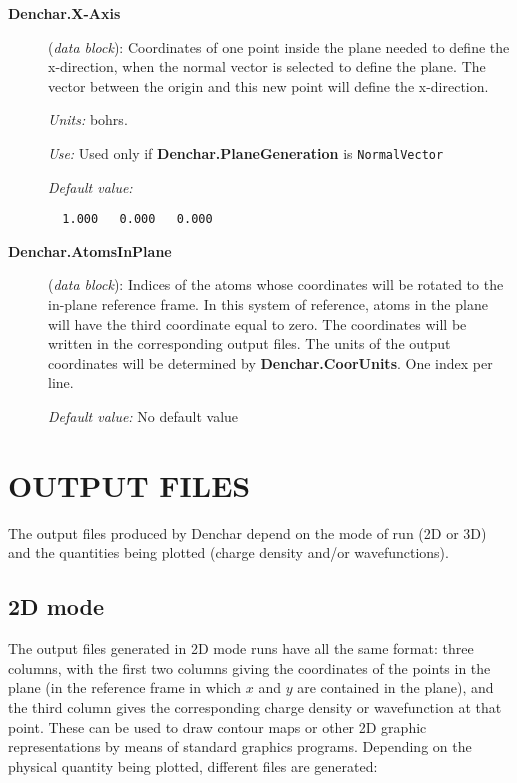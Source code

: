 \begin{description}
\item[{\bf Denchar.X-Axis}] ({\it data block}): 
Coordinates of one point inside the plane needed to define the x-direction,
when the normal vector is selected to define the plane. The vector between 
the origin and this new point will define the x-direction.

{\it Units:} bohrs.

{\it Use:} Used only if {\bf Denchar.PlaneGeneration} is {\tt NormalVector} 
    
{\it Default value:} 
\begin{verbatim}
  1.000   0.000   0.000
\end{verbatim}

\item[{\bf Denchar.AtomsInPlane}] ({\it data block}): 
Indices of the atoms whose coordinates will be rotated to the in-plane 
reference frame. In this system of reference, atoms in the plane will have 
the third coordinate equal to zero. 
The coordinates will be written in the corresponding output files. The
units of the output coordinates will be determined by {\bf Denchar.CoorUnits}.
One index per line.

{\it Default value:} No default value 

\end{description}

\section{OUTPUT FILES}
\label{cap:output} 

The output files produced by {\sc Denchar} depend on 
the mode of run (2D or 3D) and the quantities being plotted
(charge density and/or wavefunctions).

\subsection{2D mode}
\label{cap:output2D}

The output files generated in 2D mode runs have all the
same format: three 
columns, with the first two columns giving the coordinates of the points
in the plane (in the reference frame in which $x$ and $y$ are
contained in the plane), and
the third column gives the corresponding charge density or wavefunction
at that point. These can be used to draw contour maps or other 
2D graphic representations by means of standard graphics programs.
Depending on the physical quantity being plotted, 
different files are generated:

